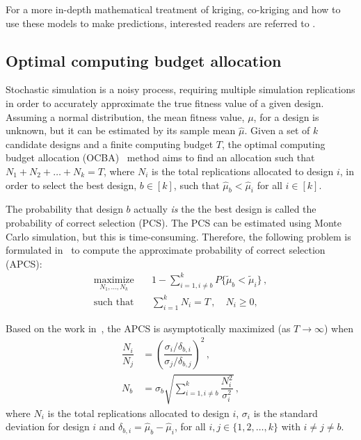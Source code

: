 For a more in-depth mathematical treatment of kriging, co-kriging and how to use these models to make predictions, interested readers are referred to \cite{forrester2008engineering,forrester2007multi,kennedy2001bayesian,kennedy2000predicting}.

\subsection{Optimal computing budget allocation}
Stochastic simulation is a noisy process, requiring multiple simulation replications in order to accurately approximate the true fitness value of a given design. Assuming a normal distribution, the mean fitness value, $\mu$, for a design is unknown, but it can be estimated by its sample mean $\hat{\mu}$. 
Given a set of $k$ candidate designs and a finite computing budget $T$, the optimal computing budget allocation (OCBA)~\cite{chen2011stochastic} method aims to find an allocation such that ${N_1 + N_2 + \ldots + N_k = T}$, where $N_i$ is the total replications allocated to design $i$, in order to select the best design, $b \in [k]$, such that $\hat{\mu}_b < \hat{\mu}_i$ for all $i \in [k]$.

The probability that design $b$ actually \emph{is} the the best design is called the probability of correct selection (PCS). The PCS can be estimated using Monte Carlo simulation, but this is time-consuming. Therefore, the following problem is formulated in~\cite{chen2011stochastic} to compute the approximate probability of correct selection (APCS):
\begin{align}
\underset{N_1,\dots,N_k}{\text{maximize}}&\quad 1 - \displaystyle\sum^k_{i=1,i\neq b}P\{\tilde\mu_b < \tilde\mu_i\}\,,\nonumber\\
\text{such that}& \quad \displaystyle\sum^k_{i=1}N_i = T\,, \quad N_i \geq 0,
\end{align}

Based on the work in~\cite{chen2011stochastic}, the APCS is asymptotically maximized (as $T \to \infty$) when
\begin{align}
\dfrac{N_i}{N_j} &= \left(\dfrac{\sigma_i/\delta_{b,i}}{\sigma_j/\delta_{b,j}}\right)^2\,,\label{eq:apcs1}\\[0.2cm]
N_b &= \sigma_b \sqrt{\displaystyle\sum^k_{i=1,i\neq b}\dfrac{N_i^2}{\sigma_i^2}}\,,\label{eq:apcs2}
\end{align}
where $N_i$ is the total replications allocated to design $i$, $\sigma_i$ is the standard deviation for design $i$ and $\delta_{b,i} = \hat{\mu}_b - \hat{\mu}_i$, for all $i,j\in \{1,2,\dots,k\}$ with $i \neq j \neq b$.

